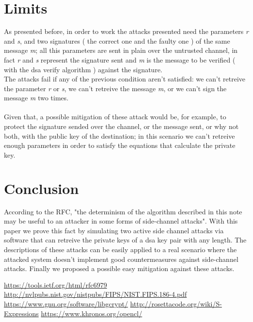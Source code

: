 \documentclass[11pt,english]{article}
\begin{document}
\section{Limits}
As presented before, in order to work the attacks presented need the parameters \textit{r} and \textit{s}, and two signatures ( the correct one and the faulty one ) of the same message \textit{m}; all this parameters are sent in plain over the untrusted channel, in fact \textit{r} and \textit{s} represent the signature sent and \textit{m} is the message to be verified ( with the dsa verify algorithm ) against the signature.\\
The attacks fail if any of the previous condition aren't satisfied: we can't retreive the parameter \textit{r} or \textit{s}, we can't retreive the message \textit{m}, or we can't sign the message \textit{m} two times.\\\\
Given that, a possible mitigation of these attack would be, for example, to protect the signature sended over the channel, or the  message sent, or why not both, with the public key of the destination; in this scenario we can't retreive enough parameters in order to satisfy the equations that calculate the private key.


\section{Conclusion}
According to the RFC\cite{rfc}, "the determinism of the algorithm described in this note may be useful to an attacker in some forms of side-channel attacks". With this paper we prove this fact by simulating two active side channel attacks via software that can retreive the private keys of a dsa key pair with any length. The descriptions of these attacks can be easily applied to a real scenario where the attacked system doesn't implement good countermeasures against side-channel attacks. Finally we proposed a possible easy mitigation against these attacks. 

\begin{thebibliography}{10}
 \url{https://tools.ietf.org/html/rfc6979}
 \url{http://nvlpubs.nist.gov/nistpubs/FIPS/NIST.FIPS.186-4.pdf}
 \url{https://www.gnu.org/software/libgcrypt/}
 \url{http://rosettacode.org/wiki/S-Expressions}
 \url{https://www.khronos.org/opencl/}
\end{thebibliography}
\end{document}
